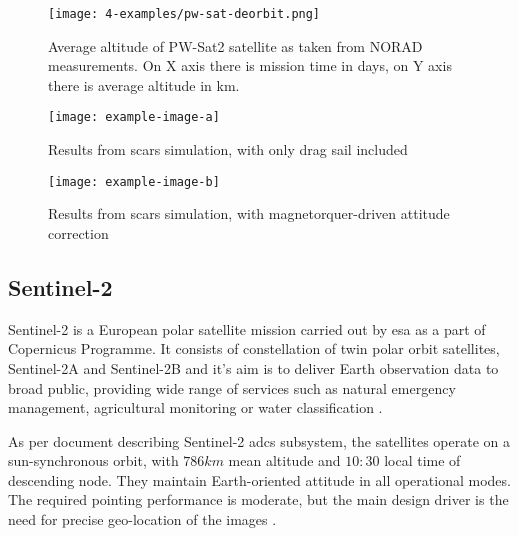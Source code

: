             \begin{figure}[H]
                \centering
                \texttt{[image: 4-examples/pw-sat-deorbit.png]}
                \caption{Average altitude of PW-Sat2 satellite as taken from NORAD measurements. On X axis there is mission time in days, on Y axis there is average altitude in km.}
                \label{fig:pw-sat-deorbit}
            \end{figure}
            
            \begin{figure}[H]
                \centering
                \texttt{[image: example-image-a]}
                \caption{Results from \ac{scars} simulation, with only drag sail included}
                \label{fig:scars-deorbit2}
            \end{figure}
            
            \begin{figure}[H]
                \centering
                \texttt{[image: example-image-b]}
                \caption{Results from \ac{scars} simulation, with magnetorquer-driven attitude correction}
                \label{fig:scars-deorbit3}
            \end{figure}




    \subsection{Sentinel-2} 
    
    Sentinel-2 is a European polar satellite mission carried out by \ac{esa} as a part of Copernicus Programme. It consists of constellation of twin polar orbit satellites, Sentinel-2A and Sentinel-2B and it's aim is to deliver Earth observation data to broad public, providing wide range of services such as natural emergency management, agricultural monitoring or water classification  \cite{sentinelreference_description}.

    As per document describing Sentinel-2 \ac{adcs} subsystem, the satellites operate on a sun-synchronous orbit, with $786km$ mean altitude and $10:30$ local time of descending node. They maintain Earth-oriented attitude in all operational modes. The required pointing performance is moderate, but the main design driver is the need for precise geo-location of the images \cite{sentinelreference_adcs}.

